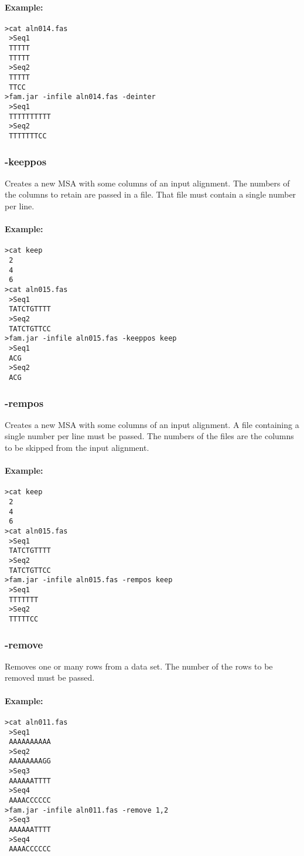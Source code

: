 \documentclass[a4paper, twoside,10pt]{article}
\begin{document}
\paragraph{Example:}
\begin{verbatim}
>cat aln014.fas
 >Seq1
 TTTTT
 TTTTT
 >Seq2
 TTTTT
 TTCC
>fam.jar -infile aln014.fas -deinter
 >Seq1
 TTTTTTTTTT
 >Seq2
 TTTTTTTCC
\end{verbatim}


\subsubsection{-keeppos}
Creates a new MSA with some columns of an input alignment. The numbers of the 
columns to retain are passed in a file. That file must contain a single number
per line.  
\paragraph{Example:}
\begin{verbatim}
>cat keep
 2
 4
 6
>cat aln015.fas
 >Seq1
 TATCTGTTTT
 >Seq2
 TATCTGTTCC
>fam.jar -infile aln015.fas -keeppos keep
 >Seq1
 ACG
 >Seq2
 ACG
\end{verbatim}

\subsubsection{-rempos}
Creates a new MSA with some columns of an input alignment. A file containing a 
single number per line must be passed. The numbers of the files are the columns
to be skipped from the input alignment. 
\paragraph{Example:}
\begin{verbatim}
>cat keep
 2
 4
 6
>cat aln015.fas
 >Seq1
 TATCTGTTTT
 >Seq2
 TATCTGTTCC
>fam.jar -infile aln015.fas -rempos keep
 >Seq1
 TTTTTTT
 >Seq2
 TTTTTCC
\end{verbatim}

\subsubsection{-remove}
Removes one or many rows from a data set. The number of the rows to be removed 
must be passed.
\paragraph{Example:}
\begin{verbatim}
>cat aln011.fas
 >Seq1
 AAAAAAAAAA
 >Seq2
 AAAAAAAAGG
 >Seq3
 AAAAAATTTT
 >Seq4
 AAAACCCCCC
>fam.jar -infile aln011.fas -remove 1,2 
 >Seq3
 AAAAAATTTT
 >Seq4
 AAAACCCCCC
\end{verbatim}
\end{document}
